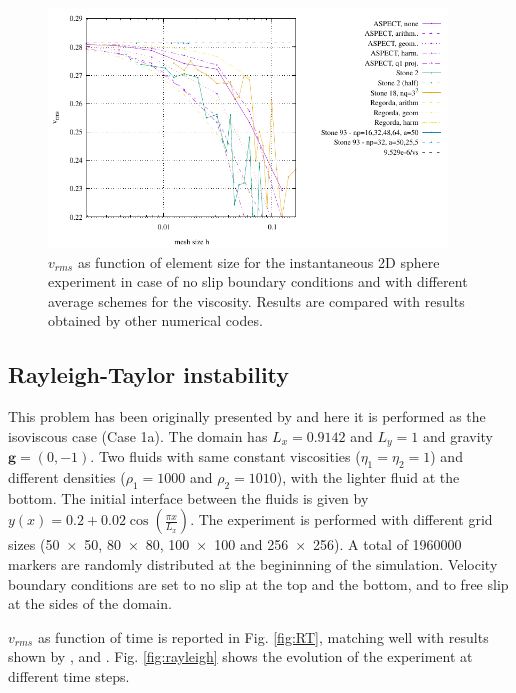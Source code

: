 \documentclass[hidelinks,11pt,a4paper]{article}
\begin{document}
\begin{figure}
\centering
\noindent\includegraphics[width=400px]{./Figures/vrms_NS.pdf}
\caption{$v_{rms}$ as function of element size for the instantaneous 2D sphere experiment in case of no slip boundary conditions and with different average schemes for the viscosity. Results are compared with results obtained by other numerical codes.}
\label{fig:inst_sphere}
\end{figure}

\subsection{Rayleigh-Taylor instability}\label{sec:rayleigh}
This problem has been originally presented by \citet{vanKeken1997} and here it is performed as the isoviscous case (Case 1a). The domain has $L_x=0.9142$ and $L_y=1$ and gravity $\bm{g}=(0,-1)$. Two fluids with same constant viscosities ($\eta_1=\eta_2=1$) and different densities ($\rho_1=1000$ and $\rho_2=1010$), with the lighter fluid at the bottom. The initial interface between the fluids is given by $y(x)=0.2+0.02 \cos \left(\frac{\pi x}{L_x}\right)$. The experiment is performed with different grid sizes (\num{50x50}, \num{80x80}, \num{100x100} and \num{256x256}). A total of 1960000 markers are randomly distributed at the begininning of the simulation. Velocity boundary conditions are set to no slip at the top and the bottom, and to free slip at the sides of the domain.

$v_{rms}$ as function of time is reported in Fig. \ref{fig:RT}, matching well with results shown by \citet{vanKeken1997}, \citet{Tackley2003} and \citet{Thieulot2014}. Fig. \ref{fig:rayleigh} shows the evolution of the experiment at different time steps.
\end{document}

